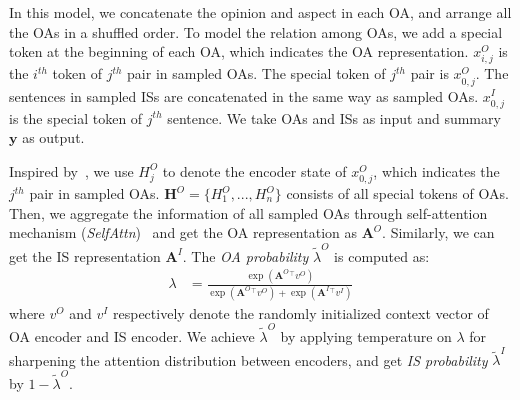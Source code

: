 In this model, 
we concatenate the opinion and aspect in each OA,
and arrange all the OAs in a shuffled order.
To model the relation among OAs,
we add a special token at the beginning of each OA, 
which indicates the OA representation.
$x^O_{i,j}$ is the $i^{th}$ token of $j^{th}$ pair in sampled OAs. 
The special token of $j^{th}$ pair is $x^O_{0,j}$.
The sentences in sampled ISs are concatenated in the
same way as sampled OAs.
$x^I_{0,j}$ is the special token of $j^{th}$ sentence.
We take OAs and ISs as input and summary $\textbf{y}$ as output.

Inspired by~\citet{DialogMV2020},
we use $H^O_{j}$ to denote the encoder state of $x^O_{0,j}$,
which indicates the $j^{th}$ pair in sampled OAs.
$\textbf{H}^O=\{H^O_{1},...,H^O_n\}$ consists of all special tokens of OAs.
Then, we aggregate the information of all sampled OAs through self-attention mechanism (\textit{SelfAttn})~\cite{Transformer17} and get the OA representation as $\textbf{A}^O$.
Similarly, we can get the IS representation $\textbf{A}^I$.
The {\em OA probability} $	\widetilde{\lambda}^O$  is computed as:
\begin{align}
	\lambda &= \frac{\exp(\textbf{A}^O {^\top} v^O)}{\exp(\textbf{A}^O {^\top} v^O)+\exp(\textbf{A}^I {^\top} v^I)} 
\end{align}
where $v^O$ and $v^I$ respectively denote the randomly initialized context vector of OA encoder and IS encoder.
We achieve $\widetilde{\lambda}^O$ by applying temperature on $\lambda $ for sharpening the attention distribution between encoders,
and get {\em IS probability} $\widetilde{\lambda}^I$ by $1-\widetilde{\lambda}^O$.


